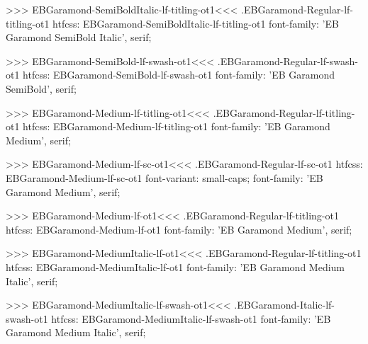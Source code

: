 {{{{{{{>>>
\<EBGaramond-SemiBoldItalic-lf-titling-ot1\><<<
.EBGaramond-Regular-lf-titling-ot1
htfcss:  EBGaramond-SemiBoldItalic-lf-titling-ot1  font-family: 'EB Garamond SemiBold Italic', serif;

>>>
\<EBGaramond-SemiBold-lf-swash-ot1\><<<
.EBGaramond-Regular-lf-swash-ot1
htfcss:  EBGaramond-SemiBold-lf-swash-ot1  font-family: 'EB Garamond SemiBold', serif;

>>>
\<EBGaramond-Medium-lf-titling-ot1\><<<
.EBGaramond-Regular-lf-titling-ot1
htfcss:  EBGaramond-Medium-lf-titling-ot1  font-family: 'EB Garamond Medium', serif;

>>>
\<EBGaramond-Medium-lf-sc-ot1\><<<
.EBGaramond-Regular-lf-sc-ot1
htfcss:  EBGaramond-Medium-lf-sc-ot1  font-variant: small-caps; font-family: 'EB Garamond Medium', serif;

>>>
\<EBGaramond-Medium-lf-ot1\><<<
.EBGaramond-Regular-lf-titling-ot1
htfcss:  EBGaramond-Medium-lf-ot1  font-family: 'EB Garamond Medium', serif;

>>>
\<EBGaramond-MediumItalic-lf-ot1\><<<
.EBGaramond-Regular-lf-titling-ot1
htfcss:  EBGaramond-MediumItalic-lf-ot1  font-family: 'EB Garamond Medium Italic', serif;

>>>
\<EBGaramond-MediumItalic-lf-swash-ot1\><<<
.EBGaramond-Italic-lf-swash-ot1
htfcss:  EBGaramond-MediumItalic-lf-swash-ot1  font-family: 'EB Garamond Medium Italic', serif;

}}}}}}}
